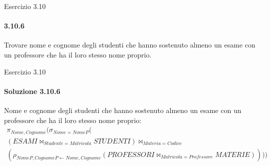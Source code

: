 %
%
\begin{frame}{Esercizio 3.10}
    \framesubtitle{3.10.6}
    Trovare nome e cognome degli studenti che hanno sostenuto almeno un esame con un professore che ha il
    loro stesso nome proprio.
\end{frame}
%
\begin{frame}{Esercizio 3.10}
    \framesubtitle{Soluzione 3.10.6}
    \vspace*{-1.2cm}
    {\small Nome e cognome degli studenti che hanno sostenuto almeno un esame con un professore che ha il
    loro stesso nome proprio:}
    \small
    \begin{gather*}
        \pi_{Nome,Cognome}(\sigma_{Nome=NomeP}(\\
        (ESAMI \bowtie_{Studente=Matricola} STUDENTI) \bowtie_{Materia=Codice}\\
        (\rho_{NomeP,CognomeP \leftarrow Nome,Cognome} (PROFESSORI \bowtie_{Matricola=Professore} MATERIE))))        
    \end{gather*}
\end{frame}